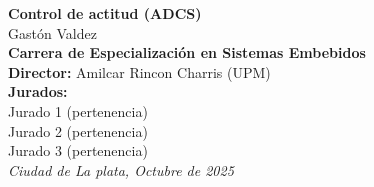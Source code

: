 \begin{titlepage}
	
	\begin{flushright}
		\setlength{\rightskip}{-2cm} %
		\vspace*{7.5cm} %
		
		{\bfseries\fontsize{33pt}{40pt}\selectfont
			Control de actitud (ADCS)} \\[1.5cm]
		
		{\fontsize{20pt}{25pt}\selectfont
			Gastón Valdez} \\[1cm]
		
		{\fontsize{15pt}{20pt}\selectfont
			\textbf{Carrera de Especialización en Sistemas Embebidos}
		} \\[2cm]
		
		{\fontsize{11pt}{15pt}\selectfont
			\textbf{Director:} Amilcar Rincon Charris (UPM)} \\[1cm]
		
		{\fontsize{11pt}{15pt}\selectfont
			\textbf{Jurados:}} \\[0.5cm]
		{\fontsize{11pt}{15pt}\selectfont
			Jurado 1 (pertenencia)} \\ 
		{\fontsize{11pt}{15pt}\selectfont
			Jurado 2 (pertenencia)} \\ 
		{\fontsize{11pt}{15pt}\selectfont
			Jurado 3 (pertenencia)} \\[2cm]
		
		{\itshape\fontsize{10pt}{12pt}\selectfont
			Ciudad de La plata, Octubre de 2025} %
	\end{flushright}
\end{titlepage}